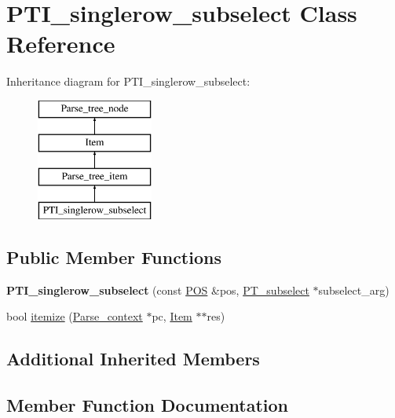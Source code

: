 \hypertarget{classPTI__singlerow__subselect}{}\section{P\+T\+I\+\_\+singlerow\+\_\+subselect Class Reference}
\label{classPTI__singlerow__subselect}
Inheritance diagram for P\+T\+I\+\_\+singlerow\+\_\+subselect\+:\begin{figure}[H]
\begin{center}
\leavevmode
\includegraphics[height=4.000000cm]{classPTI__singlerow__subselect}
\end{center}
\end{figure}
\subsection*{Public Member Functions}
\begin{DoxyCompactItemize}
\item 
\mbox{\label{classPTI__singlerow__subselect_abd7085dc441d23547457de822675269f}} 
{\bfseries P\+T\+I\+\_\+singlerow\+\_\+subselect} (const \mbox{\hyperlink{structYYLTYPE}{P\+OS}} \&pos, \mbox{\hyperlink{classPT__subselect}{P\+T\+\_\+subselect}} $\ast$subselect\+\_\+arg)
\item 
bool \mbox{\hyperlink{classPTI__singlerow__subselect_ab79156f13d68d44871ecd79811060fea}{itemize}} (\mbox{\hyperlink{structParse__context}{Parse\+\_\+context}} $\ast$pc, \mbox{\hyperlink{classItem}{Item}} $\ast$$\ast$res)
\end{DoxyCompactItemize}
\subsection*{Additional Inherited Members}


\subsection{Member Function Documentation}
\mbox{\label{classPTI__singlerow__subselect_ab79156f13d68d44871ecd79811060fea}} 
